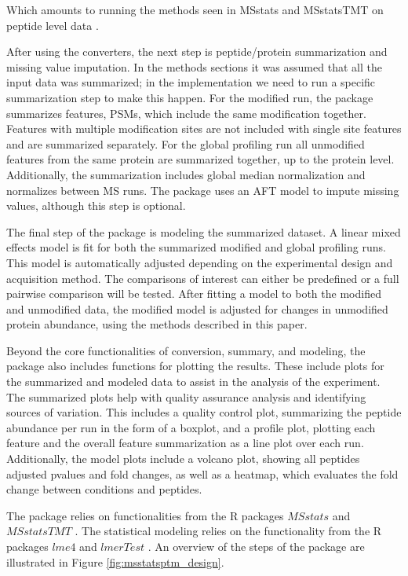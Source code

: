 \documentclass[mcp]{article}
\numberwithin{table}{section}
\begin{document}
Which amounts to running the methods seen in MSstats and MSstatsTMT on peptide level data \cite{Choi:2014} \cite{Huang:2020}.

After using the converters, the next step is peptide/protein summarization and missing value imputation. In the methods sections it was assumed that all the input data was summarized; in the implementation we need to run a specific summarization step to make this happen. For the modified run, the package summarizes features, PSMs, which include the same modification together. Features with multiple modification sites are not included with single site features and are summarized separately. For the global profiling run all unmodified features from the same protein are summarized together, up to the protein level. Additionally, the summarization includes global median normalization and normalizes between MS runs. The package uses an AFT model to impute missing values, although this step is optional.

The final step of the package is modeling the summarized dataset. A linear mixed effects model is fit for both the summarized modified and global profiling runs. This model is automatically adjusted depending on the experimental design and acquisition method. The comparisons of interest can either be predefined or a full pairwise comparison will be tested. After fitting a model to both the modified and unmodified data, the modified model is adjusted for changes in unmodified protein abundance, using the methods described in this paper. 

Beyond the core functionalities of conversion, summary, and modeling, the package also includes functions for plotting the results. These include plots for the summarized and modeled data to assist in the analysis of the experiment. The summarized plots help with quality assurance analysis and identifying sources of variation. This includes a quality control plot, summarizing the peptide abundance per run in the form of a boxplot, and a profile plot, plotting each feature and the overall feature summarization as a line plot over each run. Additionally, the model plots include a volcano plot, showing all peptides adjusted pvalues and fold changes, as well as a heatmap, which evaluates the fold change between conditions and peptides. 

The package relies on functionalities from the R packages $MSstats$ \cite{Choi:2014} and $MSstatsTMT$ \cite{Huang:2020}. The statistical modeling relies on the functionality from the R packages $lme4$ \cite{Bates2015} and $lmerTest$ \cite{Kuznetsova2017}. An overview of the steps of the package are illustrated in Figure \ref{fig:msstatsptm_design}.
\end{document}
